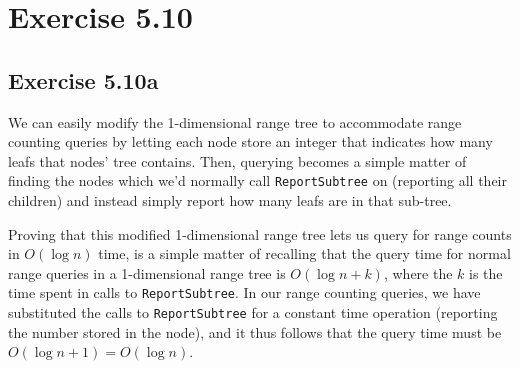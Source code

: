 \documentclass[11pt,a4paper]{article}
\begin{document}
\section{Exercise 5.10}

\subsection{Exercise 5.10a}

We can easily modify the 1-dimensional range tree to accommodate range
counting queries by letting each node store an integer that indicates
how many leafs that nodes' tree contains. Then, querying becomes a
simple matter of finding the nodes which we'd normally call
\verb+ReportSubtree+ on (reporting all their children) and instead
simply report how many leafs are in that sub-tree.

Proving that this modified 1-dimensional range tree lets us query for
range counts in $O(\log n)$ time, is a simple matter of recalling that
the query time for normal range queries in a 1-dimensional range tree
is $O(\log n + k)$, where the $k$ is the time spent in calls to
\verb+ReportSubtree+. In our range counting queries, we have
substituted the calls to \verb+ReportSubtree+ for a constant time
operation (reporting the number stored in the node), and it thus
follows that the query time must be $O(\log n + 1) = O(\log n)$.
\end{document}
